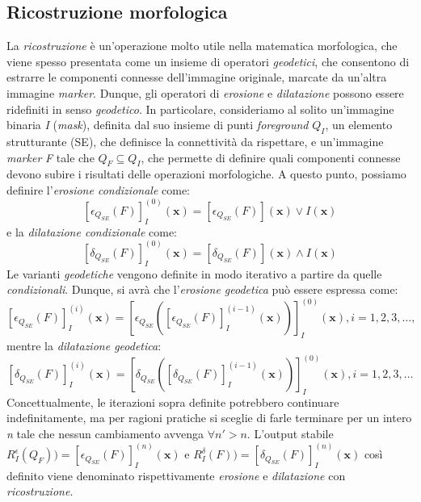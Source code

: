 \subsection{Ricostruzione morfologica}
\label{subsec:math-morph-reconstruction}
La \textit{ricostruzione} \`e un'operazione molto utile nella matematica morfologica, che viene spesso presentata come un insieme di operatori \textit{geodetici}, che consentono di estrarre le componenti connesse dell'immagine originale, marcate da un'altra immagine \textit{marker}. Dunque, gli operatori di \textit{erosione} e \textit{dilatazione} possono essere ridefiniti in senso \textit{geodetico}. In particolare, consideriamo al solito un'immagine binaria \textit{I} (\textit{mask}), definita dal suo insieme di punti \textit{foreground} $Q_{I}$, un elemento strutturante (SE), che definisce la connettivit\`a da rispettare, e un'immagine \textit{marker} \textit{F} tale che $Q_{F} \subseteq Q_{I}$, che permette di definire quali componenti connesse devono subire i risultati delle operazioni morfologiche. A questo punto, possiamo definire l'\textit{erosione condizionale} come:
\begin{equation}
	\label{eq:conditional-erosion}
	[\epsilon_{Q_{SE}}(F)]^{(0)}_{I}(\textbf{x}) = [\epsilon_{Q_{SE}}(F)](\textbf{x}) \vee I(\textbf{x})
\end{equation}
e la \textit{dilatazione condizionale} come:
\begin{equation}
	\label{eq:conditional-dilation}
	[\delta_{Q_{SE}}(F)]^{(0)}_{I}(\textbf{x}) = [\delta_{Q_{SE}}(F)](\textbf{x}) \wedge I(\textbf{x})
\end{equation}
Le varianti \textit{geodetiche} vengono definite in modo iterativo a partire da quelle \textit{condizionali}. Dunque, si avr\`a che l'\textit{erosione geodetica} pu\`o essere espressa come:
\begin{equation}
	\label{eq:geodesic-erosion}
	[\epsilon_{Q_{SE}}(F)]^{(i)}_{I}(\textbf{x}) = [\epsilon_{Q_{SE}}([\epsilon_{Q_{SE}}(F)]^{(i-1)}_{I}(\textbf{x}))]^{(0)}_{I}(\textbf{x}), i=1,2,3,\dots,
\end{equation}
mentre la \textit{dilatazione geodetica}:
\begin{equation}
	\label{eq:geodesic-dilation}
	[\delta_{Q_{SE}}(F)]^{(i)}_{I}(\textbf{x}) = [\delta_{Q_{SE}}([\delta_{Q_{SE}}(F)]^{(i-1)}_{I}(\textbf{x}))]^{(0)}_{I}(\textbf{x}), i=1,2,3,\dots
\end{equation}
Concettualmente, le iterazioni sopra definite potrebbero continuare indefinitamente, ma per ragioni pratiche si sceglie di farle terminare per un intero \textit{n} tale che nessun cambiamento avvenga $\forall n' > n$. L'output stabile $R^{\epsilon}_{I}(Q_{F}))=[\epsilon_{Q_{SE}}(F)]^{(n)}_{I}(\textbf{x})$ e $R^{\delta}_{I}(F))=[\delta_{Q_{SE}}(F)]^{(n)}_{I}(\textbf{x})$ cos\`i definito viene denominato rispettivamente \textit{erosione} e \textit{dilatazione} con \textit{ricostruzione}.
